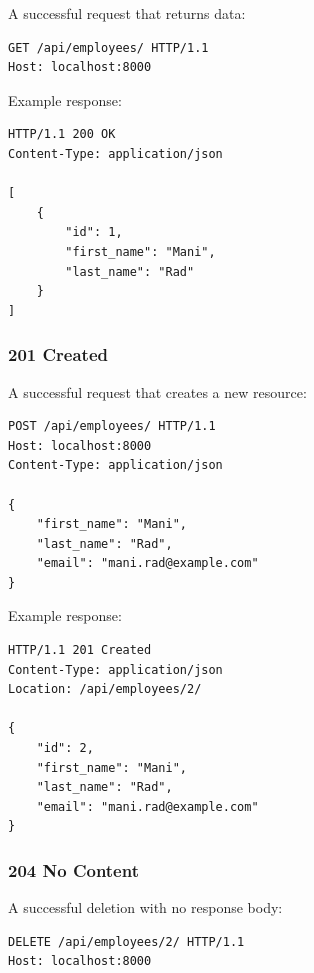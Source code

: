 \documentclass[a4paper]{article}
\begin{document}
                A successful request that returns data:
            
            \begin{verbatim}
GET /api/employees/ HTTP/1.1
Host: localhost:8000
                \end{verbatim}
                
                Example response:
            
            \begin{verbatim}
HTTP/1.1 200 OK
Content-Type: application/json

[
    {
        "id": 1,
        "first_name": "Mani",
        "last_name": "Rad"
    }
]
                \end{verbatim}
            
            \subsubsection{201 Created}
                
                A successful request that creates a new resource:
            
            \begin{verbatim}
POST /api/employees/ HTTP/1.1
Host: localhost:8000
Content-Type: application/json

{
    "first_name": "Mani",
    "last_name": "Rad",
    "email": "mani.rad@example.com"
}
                \end{verbatim}
                
                Example response:
            
            \begin{verbatim}
HTTP/1.1 201 Created
Content-Type: application/json
Location: /api/employees/2/

{
    "id": 2,
    "first_name": "Mani",
    "last_name": "Rad",
    "email": "mani.rad@example.com"
}
                \end{verbatim}
            
            \subsubsection{204 No Content}
                
                A successful deletion with no response body:
            
            \begin{verbatim}
DELETE /api/employees/2/ HTTP/1.1
Host: localhost:8000
                \end{verbatim}
                
\end{document}
